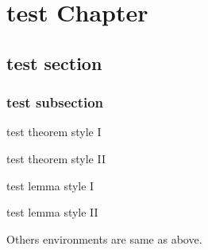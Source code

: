 \chapter{test Chapter}
\section{test section}
\subsection{test subsection}
\begin{theorem}
test theorem style I
\end{theorem}

\begin{thm}\label{thm:2}
test theorem style II
\end{thm}

\begin{lemma}
test lemma style I
\end{lemma}

\begin{lem}\label{lem:2}
test lemma style II
\end{lem}

Others environments are same as above.